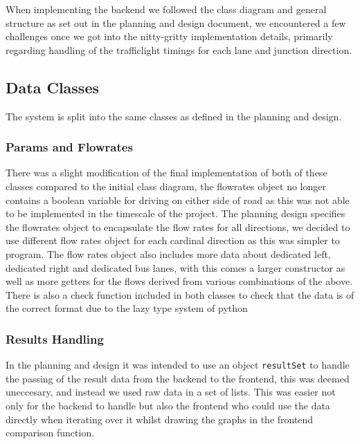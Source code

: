 \documentclass{article}
\begin{document}
    When implementing the backend we followed the class diagram and general structure as set out in the planning and
    design document, we encountered a few challenges once we got into the nitty-gritty implementation details, primarily
    regarding handling of the trafficlight timings for each lane and junction direction.

    \subsection{Data Classes}

    The system is split into the same classes as defined in the planning and design.

    \subsubsection{Params and Flowrates}

    There was a slight modification of the final implementation of both of these classes compared to the initial class
    diagram, the flowrates object no longer contains a boolean variable for driving on either side of road as this was
    not able to be implemented in the timescale of the project. The planning design specifies the flowrates object to
    encapsulate the flow rates for all directions, we decided to use different flow rates object for each cardinal
    direction as this was simpler to program. The flow rates object also includes more data about dedicated left,
    dedicated right and dedicated bus lanes, with this comes a larger constructor as well as more getters for the
    flows derived from various combinations of the above. There is also a check function included in both classes to
    check that the data is of the correct format due to the lazy type system of python

    \subsubsection{Results Handling}

    In the planning and design it was intended to use an object \texttt{resultSet} to handle the passing of the result
    data from the backend to the frontend, this was deemed uneccesary, and instead we used raw data in a set of lists.
    This was easier not only for the backend to handle but also the frontend who could use the data directly when iterating
    over it whilst drawing the graphs in the frontend comparison function.
\end{document}
